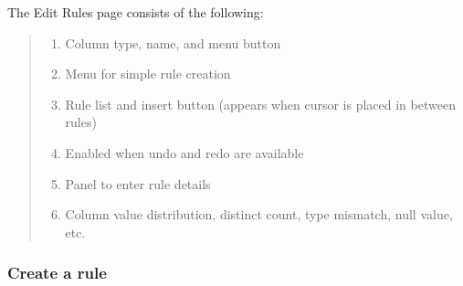 \documentclass[letterpaper,10pt,english]{sphinxmanual}
\begin{document}
The Edit Rules page consists of the following:
\begin{quote}

\begin{figure}[H]
\centering

\noindent{}
\end{figure}
\begin{enumerate}
\def\theenumi{\arabic{enumi}}
\def\labelenumi{\theenumi .}
\makeatletter\def\p@enumii{\p@enumi \theenumi .}\makeatother
\item {} 
Column type, name, and menu button

\item {} 
Menu for simple rule creation

\item {} 
Rule list and insert button (appears when cursor is placed in between rules)

\item {} 
Enabled when undo and redo are available

\item {} 
Panel to enter rule details

\item {} 
Column value distribution, distinct count, type mismatch, null value, etc.

\end{enumerate}
\end{quote}


\subsubsection{Create a rule}
\label{\detokenize{discovery/part07/edit_rules:id2}}
\end{document}
